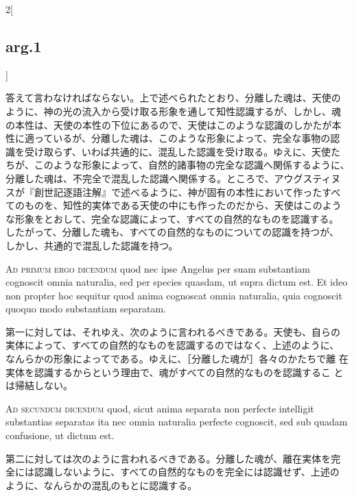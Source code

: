 \documentclass[paper=a4paper,fontsize=10pt,jafontsize=9pt,titlepage]{jlreq}
\begin{document}
\begin{paracol}{2}[\subsection{arg.1}]
\switchcolumn

答えて言わなければならない。上で述べられたとおり、分離した魂は、天使の
ように、神の光の流入から受け取る形象を通して知性認識するが、しかし、魂
の本性は、天使の本性の下位にあるので、天使はこのような認識のしかたが本
性に適っているが、分離した魂は、このような形象によって、完全な事物の認
識を受け取らず、いわば共通的に、混乱した認識を受け取る。ゆえに、天使た
ちが、このような形象によって、自然的諸事物の完全な認識へ関係するように、
分離した魂は、不完全で混乱した認識へ関係する。ところで、アウグスティヌ
スが『創世記逐語注解』で述べるように、神が固有の本性において作ったすべ
てのものを、知性的実体である天使の中にも作ったのだから、天使はこのよう
な形象をとおして、完全な認識によって、すべての自然的なものを認識する。
したがって、分離した魂も、すべての自然的なものについての認識を持つが、
しかし、共通的で混乱した認識を持つ。

\switchcolumn*[\subsection{ad.1}]

{\scshape Ad primum ergo dicendum} quod nec ipse Angelus per suam
substantiam cognoscit omnia naturalia, sed per species quasdam, ut
supra dictum est. Et ideo non propter hoc sequitur quod anima
cognoscat omnia naturalia, quia cognoscit quoquo modo substantiam
separatam.

\switchcolumn

第一に対しては、それゆえ、次のように言われるべきである。天使も、自らの
実体によって、すべての自然的なものを認識するのではなく、上述のように、
なんらかの形象によってである。ゆえに、［分離した魂が］各々のかたちで離
在実体を認識するからという理由で、魂がすべての自然的なものを認識するこ
とは帰結しない。

\switchcolumn*[\subsection{ad.2}]

{\scshape Ad secundum dicendum} quod, sicut anima separata non perfecte
intelligit substantias separatas ita nec omnia naturalia perfecte
cognoscit, sed sub quadam confusione, ut dictum est.

\switchcolumn

第二に対しては次のように言われるべきである。分離した魂が、離在実体を完
全には認識しないように、すべての自然的なものを完全には認識せず、上述の
ように、なんらかの混乱のもとに認識する。


\end{paracol}
\end{document}
